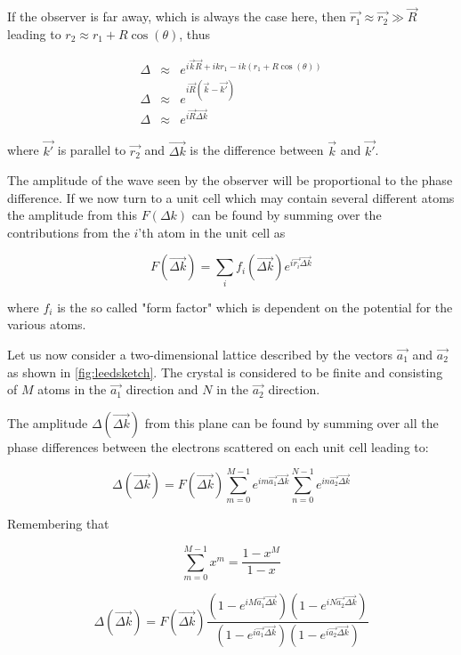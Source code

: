 If the observer is far away, which is always the case here, then $\vec{r_1}\approx\vec{r_2}\gg \vec{R}$ leading to $r_2\approx r_1+R\cos(\theta)$, thus

\begin{eqnarray}
\Delta	& \approx	& e^{i\vec{k}\vec{R}+ikr_1-ik(r_1+R\cos(\theta))}\\ 
\Delta	& \approx	& e^{i \vec{R}( \vec{k}-\vec{k\prime})}\\
\Delta	& \approx	& e^{i\vec{R} \vec{\Delta k}}
\end{eqnarray}

\noindent where $\vec{k\prime}$ is parallel to $\vec{r_2}$ and  $\vec{\Delta k}$ is the difference between $\vec{k}$ and $\vec{k\prime}$.

The amplitude of the wave seen by the observer will be  proportional to the phase difference. If we now turn to a unit cell which may contain several different atoms the amplitude from this  $F(\Delta k)$ can be found by summing over the contributions from the $i$'th atom in the unit cell as

\begin{equation}
F(\vec{\Delta k})=\sum_i f_i(\vec{\Delta k})e^{i\vec{r_i}\vec{\Delta k}}
\end{equation}

\noindent where $f_i$ is the so called "form factor" which is dependent on the potential for the various atoms.

Let us now consider a two-dimensional lattice described by the vectors $\vec{a_1}$ and $\vec{a_2}$ as shown in \autoref{fig:leedsketch}. The crystal is considered to be finite and consisting of $M$ atoms in the $\vec{a_1}$ direction and $N$ in the $\vec{a_2}$ direction.

The amplitude $\Delta(\vec{\Delta k})$ from this plane can be found by summing over all the phase differences between the electrons scattered on each unit cell leading to:

\begin{equation}
\Delta(\vec{\Delta k})=F(\vec{\Delta k})\sum_{m=0}^{M-1}e^{im\vec{a_1}\vec{\Delta k}}\sum_{n=0}^{N-1}e^{in\vec{a_2}\vec{\Delta k}}
\end{equation}

Remembering that

\begin{equation}
\sum_{m=0}^{M-1}x^m=\frac{1-x^M}{1-x}
\end{equation}

\begin{equation}
\Delta(\vec{\Delta k})=F(\vec{\Delta k})\frac{(1-e^{iM\vec{a_1}\vec{\Delta k}})(1-e^{iN\vec{a_2}\vec{\Delta k}})}{(1-e^{i\vec{a_1}\vec{\Delta k}})(1-e^{i\vec{a_2}\vec{\Delta k}})}
\end{equation}

